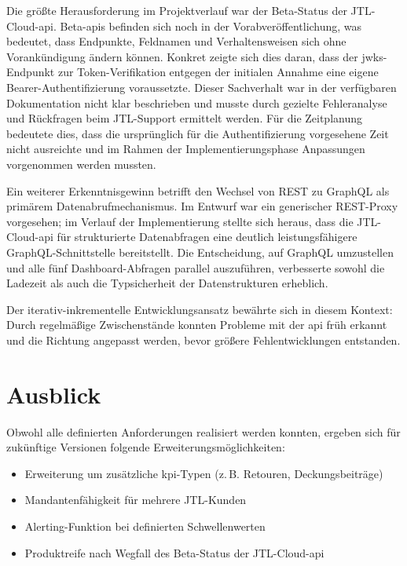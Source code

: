 \documentclass[11pt, a4paper, oneside]{report}
\begin{document}
Die größte Herausforderung im Projektverlauf war der Beta-Status der
JTL-Cloud-\gls{api}. Beta-\glspl{api} befinden sich noch in der Vorabveröffentlichung,
was bedeutet, dass Endpunkte, Feldnamen und Verhaltensweisen sich ohne
Vorankündigung ändern können. Konkret zeigte sich dies daran, dass der
\gls{jwks}-Endpunkt zur Token-Verifikation entgegen der initialen Annahme eine
eigene Bearer-Authentifizierung voraussetzte. Dieser Sachverhalt war in der
verfügbaren Dokumentation nicht klar beschrieben und musste durch gezielte
Fehleranalyse und Rückfragen beim JTL-Support ermittelt werden. Für die
Zeitplanung bedeutete dies, dass die ursprünglich für die Authentifizierung
vorgesehene Zeit nicht ausreichte und im Rahmen der Implementierungsphase
Anpassungen vorgenommen werden mussten.

Ein weiterer Erkenntnisgewinn betrifft den Wechsel von REST zu GraphQL als
primärem Datenabrufmechanismus. Im Entwurf war ein generischer REST-Proxy
vorgesehen; im Verlauf der Implementierung stellte sich heraus, dass die
JTL-Cloud-\gls{api} für strukturierte Datenabfragen eine deutlich leistungsfähigere
GraphQL-Schnittstelle bereitstellt. Die Entscheidung, auf GraphQL umzustellen
und alle fünf Dashboard-Abfragen parallel auszuführen, verbesserte sowohl die
Ladezeit als auch die Typsicherheit der Datenstrukturen erheblich.

Der iterativ-inkrementelle Entwicklungsansatz bewährte sich in diesem Kontext:
Durch regelmäßige Zwischenstände konnten Probleme mit der \gls{api} früh erkannt
und die Richtung angepasst werden, bevor größere Fehlentwicklungen entstanden.

\section{Ausblick}

Obwohl alle definierten Anforderungen realisiert werden konnten, ergeben sich
für zukünftige Versionen folgende Erweiterungsmöglichkeiten:

\begin{itemize}[leftmargin=1.5em]
  \item Erweiterung um zusätzliche \gls{kpi}-Typen (z.\,B. Retouren, Deckungsbeiträge)
  \item Mandantenfähigkeit für mehrere JTL-Kunden
  \item Alerting-Funktion bei definierten Schwellenwerten
  \item Produktreife nach Wegfall des Beta-Status der JTL-Cloud-\gls{api}
\end{itemize}
\end{document}
